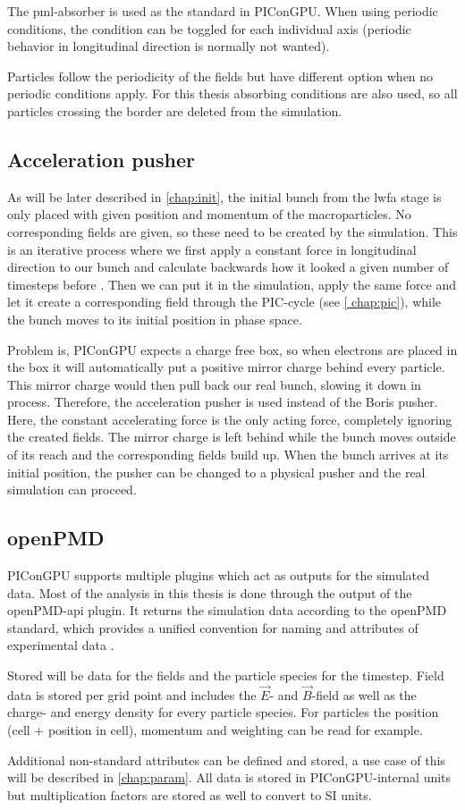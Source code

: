 \documentclass[bachelor_thesis]{subfiles}
\begin{document}
The \gls{pml}-absorber is used as the standard in PIConGPU. When using periodic conditions, the condition can be toggled for each individual axis (periodic behavior in longitudinal direction is normally not wanted).

Particles follow the periodicity of the fields but have different option when no periodic conditions apply. For this thesis absorbing conditions are also used, so all particles crossing the border are deleted from the simulation.

\subsection{Acceleration pusher} \label{chap:accpush}
As will be later described in \autoref{chap:init}, the initial bunch from the \gls{lwfa} stage is only placed with given position and momentum of the macroparticles.
No corresponding fields are given, so these need to be created by the simulation. This is an iterative process where we first apply a constant force in longitudinal direction to our bunch and calculate backwards how it looked a given number of timesteps before \cite{Huebl2014}.
Then we can put it in the simulation, apply the same force and let it create a corresponding field through the PIC-cycle (see \autoref{	chap:pic}), while the bunch moves to its initial position in phase space.

Problem is, PIConGPU expects a charge free box, so when electrons are placed in the box it will automatically put a positive mirror charge behind every particle. This mirror charge would then pull back our real 
bunch, slowing it down in process. Therefore, the acceleration pusher is used instead of the Boris pusher. Here, the constant accelerating force is the only acting force, completely ignoring the created fields.
The mirror charge is left behind while the bunch moves outside of its reach and the corresponding fields build up. When the bunch arrives at its initial position, the pusher can be changed to a physical pusher and
the real simulation can proceed.


\subsection{openPMD}
PIConGPU supports multiple plugins which act as outputs for the simulated data. Most of the analysis in this thesis is done through the output of the openPMD-api \cite{openPMDAPI} plugin.
It returns the simulation data according to the openPMD standard, which provides a unified convention for naming and attributes of experimental data \cite{openPMDstandard}.

Stored will be data for the fields and the particle species for the timestep. Field data is stored per grid point and includes the $\vec{E}$- and $\vec{B}$-field as well as the charge- and energy density for every particle species.
For particles the position (cell + position in cell), momentum and weighting can be read for example. 

Additional non-standard attributes can be defined and stored, a use case of this will be described in \autoref{chap:param}. All data is stored in PIConGPU-internal units but multiplication factors are stored as well to convert to SI units.
\end{document}
